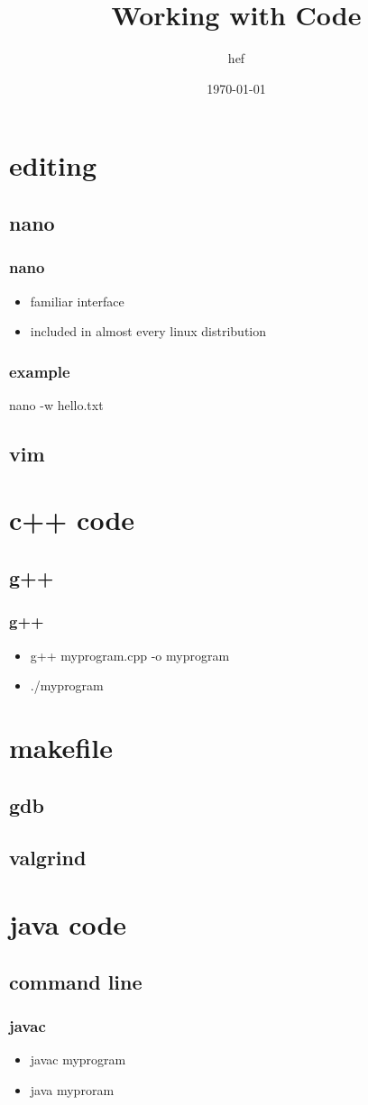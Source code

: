 \documentclass[hyperref={pdfpagelabels=false}]{beamer}
\title{Working with Code}
\author{hef}
\date{\today}
\begin{document}
\frame{\titlepage}
\section[outline]{}
\frame{\tableofcontents}
\section{editing}
\subsection{nano}
\frame
{
    \frametitle{nano}
    \begin{itemize}
    \item{familiar interface}
    \item{included in almost every linux distribution}
    \end{itemize}
}
\frame
{
    \frametitle{example}
    nano -w hello.txt
}
\subsection{vim}
\section{c++ code}
\subsection{g++}
\frame
{
    \frametitle{g++}
    \begin{itemize}
    \item{g++ myprogram.cpp -o myprogram}
    \item{./myprogram}
    \end{itemize}
}
\section{makefile}
\subsection{gdb}
\subsection{valgrind}
\section{java code}
\subsection{command line}
\frame
{
    \frametitle{javac}
    \begin{itemize}
    \item{javac myprogram}
    \item{java myproram}
    \end{itemize}
}
\end{document}

